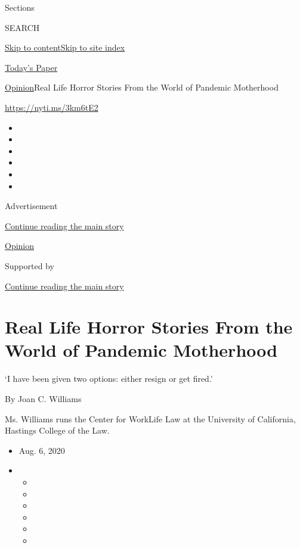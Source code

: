 Sections

SEARCH

\protect\hyperlink{site-content}{Skip to
content}\protect\hyperlink{site-index}{Skip to site index}

\href{https://myaccount.nytimes.com/auth/login?response_type=cookie\&client_id=vi}{}

\href{https://www.nytimes.com/section/todayspaper}{Today's Paper}

\href{/section/opinion}{Opinion}\textbar{}Real Life Horror Stories From
the World of Pandemic Motherhood

\href{https://nyti.ms/3km6tE2}{https://nyti.ms/3km6tE2}

\begin{itemize}
\item
\item
\item
\item
\item
\item
\end{itemize}

Advertisement

\protect\hyperlink{after-top}{Continue reading the main story}

\href{/section/opinion}{Opinion}

Supported by

\protect\hyperlink{after-sponsor}{Continue reading the main story}

\hypertarget{real-life-horror-stories-from-the-world-of-pandemic-motherhood}{%
\section{Real Life Horror Stories From the World of Pandemic
Motherhood}\label{real-life-horror-stories-from-the-world-of-pandemic-motherhood}}

`I have been given two options: either resign or get fired.'

By Joan C. Williams

Ms. Williams runs the Center for WorkLife Law at the University of
California, Hastings College of the Law.

\begin{itemize}
\item
  Aug. 6, 2020
\item
  \begin{itemize}
  \item
  \item
  \item
  \item
  \item
  \item
  \end{itemize}
\end{itemize}

